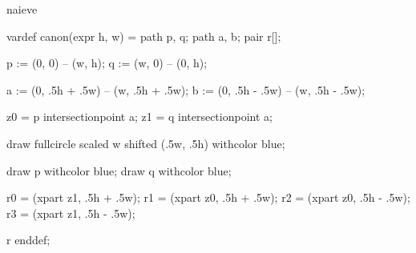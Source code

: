 

\startenvironment naieve

	\startMPdefinitions
		vardef canon(expr h, w) =
			path p, q;
			path a, b;
			pair r[];

			p := (0, 0) -- (w, h);
			q := (w, 0) -- (0, h);

			a := (0, .5h + .5w) -- (w, .5h + .5w); %
			b := (0, .5h - .5w) -- (w, .5h - .5w); %

			z0 = p intersectionpoint a; %
			z1 = q intersectionpoint a; %

			draw fullcircle scaled w shifted (.5w, .5h) withcolor blue;

			draw p withcolor blue;
			draw q withcolor blue;


			r0 = (xpart z1, .5h + .5w); %
			r1 = (xpart z0, .5h + .5w); %
			r2 = (xpart z0, .5h - .5w); %
			r3 = (xpart z1, .5h - .5w); %

			r
		enddef;
	\stopMPdefinitions

\stopenvironment

